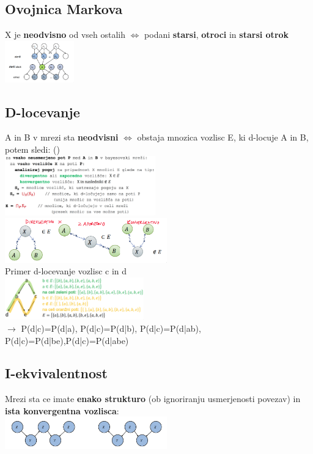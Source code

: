 \subsection{Ovojnica Markova}
X je \textbf{neodvisno} od vseh ostalih $\Leftrightarrow$ podani \textbf{starsi}, \textbf{otroci} in \textbf{starsi otrok}\\
\includegraphics[width=3cm]{images/ovojnica-markova.png}

\subsection{D-locevanje}
A in B v mrezi sta \textbf{neodvisni} $\Leftrightarrow$ obstaja mnozica vozlisc E, ki d-locuje A in B, potem sledi:  ()\\
\includegraphics[width=6.5cm]{images/d-locevanje-algoritem.png}
\includegraphics*[width=7cm]{images/d-locevanje-nacini.png}
\\
Primer d-locevanje vozlisc c in d\\
\includegraphics*[width=6cm]{images/primer-d-locevanje.png}\\
$\rightarrow$ P(d|c)=P(d|a), P(d|c)=P(d|b), P(d|c)=P(d|ab),\\
P(d|c)=P(d|be),P(d|c)=P(d|abe)

\subsection{I-ekvivalentnost}
Mrezi sta  ce imate \textbf{enako strukturo} (ob ignoriranju usmerjenosti povezav) in \textbf{ista konvergentna vozlisca}:\\
\includegraphics*[width=7cm]{./images/i-ekvivalentnost.png}